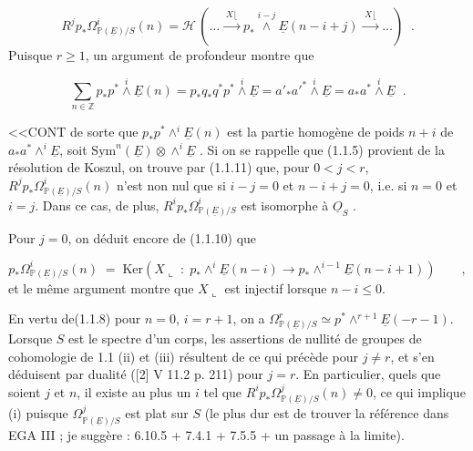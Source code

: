 \begin{equation}\tag{1.1.11}
R^j p_* \Omega^i_{\mathbb{P}(\underline{E})/S}(n) = \mathcal{H} \, ( \ldots \xrightarrow{\;X\lfloor\;} p_* \overset{i-j}{\wedge} \underline{E}(n-i+j) \xrightarrow{\;X\lfloor\;} \ldots ) \;\; .
\end{equation}
Puisque $r \geq 1$, un argument de profondeur montre que

\begin{equation}\tag{1.1.12}
\sum_{n \in \mathbb{Z}} p_*p^* \overset{i}{\wedge} \underline{E}(n) = p_*q_*q^*p^* \overset{i}{\wedge} \underline{E} = {a'}_{*}{a'}^{*} \overset{i}{\wedge} \underline{E} = a_*a^* \overset{i}{\wedge} \underline{E} \;\; .
\end{equation}


<<CONT de sorte que $p_*p^* \wedge^i \underline{E}(n)$ est la partie homogène de poids $n + i$ de $a_*a^* \wedge^i \underline{E}$, soit $\mathrm{Sym}^n(\underline{E}) \otimes \wedge^i \underline{E}$ . Si on se rappelle que (1.1.5) provient de la résolution de Koszul, on trouve par (1.1.11) que, pour $0 < j < r$, $R^j p_* \Omega^i_{\mathbb{P}(\underline{E})/S}(n)$ n'est non nul que si $i-j = 0$ et $n-i+j = 0$, i.e. si $n = 0$ et $i = j$. Dans ce cas, de plus, $R^i p_* \Omega^i_{\mathbb{P}(\underline{E})/S}$ est isomorphe à $\underline{O}_S$ .

Pour $j = 0$, on déduit encore de (1.1.10) que

\begin{equation}\tag{1.1.13}
p_*\Omega^i_{\mathbb{P}(\underline{E})/S}(n) \;=\; \mathrm{Ker}(X \llcorner \;:\; p_* \wedge^i \underline{E}(n-i) \longrightarrow p_* \wedge^{i-1} \underline{E}(n-i+1)) \qquad ,
\end{equation}
et le même argument montre que $X \llcorner$ est injectif lorsque $n-i \leq 0$.

En vertu de(1.1.8) pour $n = 0$, $i = r+1$, on a $\Omega^r_{\mathbb{P}(\underline{E})/S} \simeq p^* \wedge^{r+1} \underline{E}(-r-1)$. Lorsque $S$ est le spectre d'un corps, les assertions de nullité de groupes de cohomologie de 1.1 (ii) et (iii) résultent de ce qui précède pour $j \neq r$, et s'en déduisent par dualité ([2] V 11.2 p. 211) pour $j = r$. En particulier, quels que soient $j$ et $n$, il existe au plus un $i$ tel que $R^i p_* \Omega^j_{\mathbb{P}(\underline{E})/S}(n) \neq 0$, ce qui implique (i) puisque $\Omega^j_{\mathbb{P}(\underline{E})/S}$ est plat sur $S$ (le plus dur est de trouver la référence dans EGA III ; je suggère : 6.10.5 + 7.4.1 + 7.5.5 + un passage à la limite).

